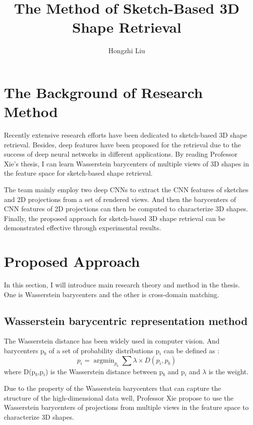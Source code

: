 \documentclass{article}
\author{Hongzhi Liu}
\title{The Method of Sketch-Based 3D Shape Retrieval}
\begin{document}
\maketitle
  \par
  \section{The Background of Research Method }
  Recently extensive research efforts have been dedicated to sketch-based 3D shape retrieval. Besides, deep features have been proposed for the retrieval due to the success of deep neural networks in different applications. By reading Professor Xie's thesis, I can learn Wasserstein barycenters of multiple views of 3D shapes in the feature space for sketch-based shape retrieval.

  The team mainly employ two deep CNNs to extract the CNN features of sketches and 2D projections from a set of rendered views. And then the barycenters of CNN features of 2D projections can then be computed to characterize 3D shapes. Finally, the proposed approach for sketch-based 3D shape retrieval can be demonstrated effective through experimental results.

\section{Proposed Approach}

  In this section, I will introduce main research theory and method in the thesis. One is Wasserstein barycenters and the other is cross-domain matching.

\subsection{Wasserstein barycentric representation method}

  The Wasserstein distance has been widely used in computer vision. And barycenters p$_{b}$ of a set of probability distributions p$_{i}$ can be defined as \cite{Cuturi2015A}:
\begin{equation}
   p_{i} = \mathop{\arg\min}_{p_{b}}{\sum{\lambda\times D(p_{i},p_{b})}}
 \end{equation}
  where D(p$_{b}$,p$_{i}$) is the Wasserstein distance between p$_{b}$ and p$_{i}$ and $\lambda$ is the weight.

  Due to the property of the Wasserstein barycenters that can capture the structure of the high-dimensional data well, Professor Xie propose to use the Wasserstein barycenters of projections from multiple views in the feature space to characterize 3D shapes.
\end{document}
